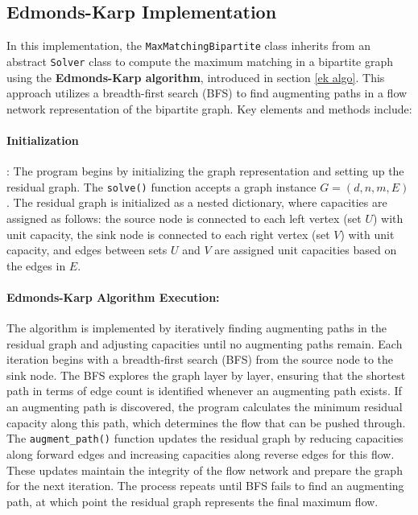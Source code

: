 
\subsection{Edmonds-Karp Implementation} \label{ekImplement}

In this implementation, the \texttt{MaxMatchingBipartite} class inherits from an abstract \texttt{Solver} class to compute the maximum matching in a bipartite graph using the \textbf{Edmonds-Karp algorithm}, introduced in section \ref{ek algo}. This approach utilizes a breadth-first search (BFS) to find augmenting paths in a flow network representation of the bipartite graph. Key elements and methods include:

\paragraph{Initialization}: The program begins by initializing the graph representation and setting up the residual graph. The \texttt{solve()} function accepts a graph instance \( G = (d, n, m, E) \). The residual graph is initialized as a nested dictionary, where capacities are assigned as follows: the source node is connected to each left vertex (set \( U \)) with unit capacity, the sink node is connected to each right vertex (set \( V \)) with unit capacity, and edges between sets \( U \) and \( V \) are assigned unit capacities based on the edges in \( E \).

\paragraph{Edmonds-Karp Algorithm Execution:} The algorithm is implemented by iteratively finding augmenting paths in the residual graph and adjusting capacities until no augmenting paths remain. Each iteration begins with a breadth-first search (BFS) from the source node to the sink node. The BFS explores the graph layer by layer, ensuring that the shortest path in terms of edge count is identified whenever an augmenting path exists. If an augmenting path is discovered, the program calculates the minimum residual capacity along this path, which determines the flow that can be pushed through. The \texttt{augment\_path()} function updates the residual graph by reducing capacities along forward edges and increasing capacities along reverse edges for this flow. These updates maintain the integrity of the flow network and prepare the graph for the next iteration. The process repeats until BFS fails to find an augmenting path, at which point the residual graph represents the final maximum flow.

